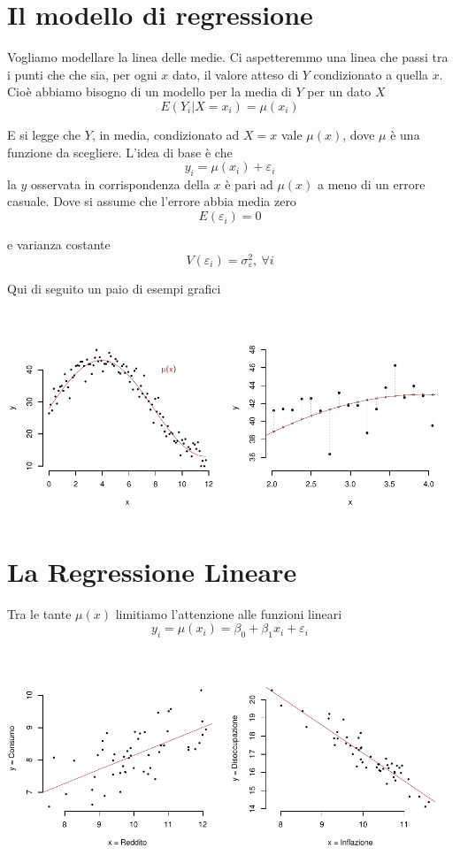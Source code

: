 \documentclass[
  11pt,
]{book}
\theoremstyle{mytheoremstyle}
\theoremstyle{mydefstyle}
\begin{document}
\section{Il modello di regressione}\label{il-modello-di-regressione}

Vogliamo modellare la linea delle medie. Ci aspetteremmo una linea che passi tra i punti che
che sia, per ogni \(x\) dato, il valore atteso di \(Y\) condizionato a quella \(x\).
Cioè abbiamo bisogno di un modello per la media di \(Y\) per un dato \(X\)
\[E(Y_i|X=x_i)=\mu(x_i)\]

E si legge che \(Y\), in media, condizionato ad \(X=x\) vale \(\mu(x)\), dove \(\mu\) è una funzione da scegliere.
L'idea di base è che
\[y_i=\mu(x_i)+\varepsilon_i\]
la \(y\) osservata in corrispondenza della \(x\) è pari ad \(\mu(x)\) a meno di un errore casuale.
Dove si assume che l'errore abbia media zero
\[E(\varepsilon_i)=0\]

e varianza costante
\[V(\varepsilon_i)=\sigma^2_{\varepsilon}, ~\forall i\]

Qui di seguito un paio di esempi grafici

\begin{center}\includegraphics{Appunti_di_Statistica_2025_files/figure-latex/17-regressione-I-3-1} \end{center}

\section{La Regressione Lineare}\label{la-regressione-lineare}

Tra le tante \(\mu(x)\) limitiamo l'attenzione alle funzioni lineari
\[
y_i=\mu(x_i)=\beta_0+\beta_1x_i+\varepsilon_i
\]

\begin{center}\includegraphics{Appunti_di_Statistica_2025_files/figure-latex/17-regressione-I-5-1} \end{center}
\end{document}
